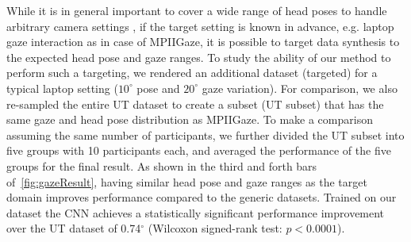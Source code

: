 While it is in general important to cover a wide range of head poses to handle arbitrary camera settings
, if the target setting is known in advance, e.g. laptop gaze interaction as in case of MPIIGaze, it is possible to target data synthesis to the expected head pose and gaze ranges.
To study the ability of our method to perform such a targeting, we rendered an additional dataset (\dataset targeted) for a typical laptop setting ($10^{\circ}$ pose and $20^{\circ}$ gaze variation).
For comparison, we also re-sampled the entire UT dataset to create a subset (UT subset) that has the same gaze and head pose distribution as MPIIGaze.
To make a comparison assuming the same number of participants, we further divided the UT subset into five groups with 10 participants each,
and averaged the performance of the five groups for the final result. 
As shown in the third and forth bars of~\autoref{fig:gazeResult}, having similar head pose and gaze ranges as the target domain improves performance compared to the generic datasets.
Trained on our \dataset dataset the CNN achieves a statistically significant performance improvement over the UT dataset of 0.74$^{\circ}$ (Wilcoxon signed-rank test: $p\!<\!0.0001$).

